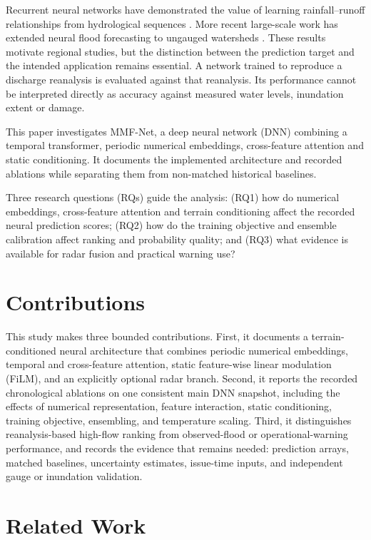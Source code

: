 \documentclass[conference]{IEEEtran}
\newcommand{\model}{MMF-Net}
\begin{document}
Recurrent neural networks have demonstrated the value of learning
rainfall--runoff relationships from hydrological sequences
\cite{kratzert2018}. More recent large-scale work has extended neural flood
forecasting to ungauged watersheds \cite{nearing2024}. These results motivate
regional studies, but the distinction between the prediction target and the
intended application remains essential. A network trained to reproduce a
discharge reanalysis is evaluated against that reanalysis. Its performance
cannot be interpreted directly as accuracy against measured water levels,
inundation extent or damage.

This paper investigates \model{}, a deep neural network (DNN) combining a
temporal transformer, periodic numerical embeddings, cross-feature attention
and static conditioning. It documents the implemented architecture and recorded
ablations while separating them from non-matched historical baselines.

Three research questions (RQs) guide the analysis: (RQ1) how do numerical embeddings,
cross-feature attention and terrain conditioning affect the recorded neural
prediction scores; (RQ2) how do the training objective and ensemble calibration
affect ranking and probability quality; and (RQ3) what evidence is available for
radar fusion and practical warning use?

\section{Contributions}
This study makes three bounded contributions. First, it documents a
terrain-conditioned neural architecture that combines periodic numerical
embeddings, temporal and cross-feature attention, static feature-wise linear
modulation (FiLM), and an explicitly optional radar branch. Second, it reports
the recorded chronological ablations on one consistent main DNN snapshot,
including the effects of numerical representation, feature interaction, static
conditioning, training objective, ensembling, and temperature scaling. Third,
it distinguishes reanalysis-based high-flow ranking from observed-flood or
operational-warning performance, and records the evidence that remains needed:
prediction arrays, matched baselines, uncertainty estimates, issue-time inputs,
and independent gauge or inundation validation.

\section{Related Work}
\end{document}
